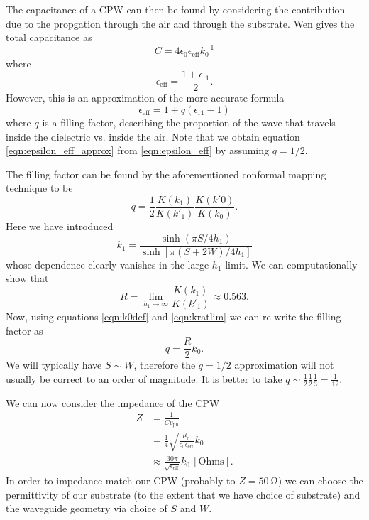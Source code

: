 \documentclass[a4paper]{article}
\begin{document}
The capacitance of a CPW can then be found by considering the contribution due
to the propgation through the air and through the substrate. Wen gives the
total capacitance as
\begin{equation}
  C = 4\epsilon_0\epsilon_\mathrm{eff} k_0^{-1}
\end{equation}
where
\begin{equation}
  \epsilon_\mathrm{eff} = \frac{1 + \epsilon_\mathrm{r1}}{2}.
  \label{eqn:epsilon_eff_approx}
\end{equation}
However, this is an approximation of the more accurate formula
\begin{equation}
  \epsilon_\mathrm{eff} = 1 + q(\epsilon_\mathrm{r1} - 1)
  \label{eqn:epsilon_eff}
\end{equation}
where $q$ is a filling factor, describing the proportion of the wave that
travels inside the dielectric vs. inside the air. Note that we obtain equation
\ref{eqn:epsilon_eff_approx} from \ref{eqn:epsilon_eff} by assuming $q = 1/2$.

The filling factor can be found by the aforementioned conformal mapping
technique to be
\begin{equation}
  q = \frac{1}{2}\frac{K(k_1)}{K(k'_1)}\frac{K(k'0)}{K(k_0)}.
  \label{eqn:fillfact}
\end{equation}
Here we have introduced
\begin{equation*}
  k_1 = \frac{\sinh (\pi S/ 4h_1)}{\sinh [\pi (S+2W)/4h_1]}
\end{equation*}
whose dependence clearly vanishes in the large $h_1$ limit. We can
computationally show that
\begin{equation}
  R = \lim_{h_1 \to \infty} \frac{K(k_1)}{K(k'_1)} \approx 0.563.
  \label{eqn:kratlim}
\end{equation}
Now, using equations \ref{eqn:k0def} and \ref{eqn:kratlim} we can re-write the
filling factor as
\begin{equation}
  q = \frac{R}{2}k_0.
\end{equation}
We will typically have $S\sim W$, therefore the $q=1/2$ approximation will  not
usually be correct to an order of magnitude. It is better to take $q\sim
\frac{1}{2} \frac{1}{2} \frac{1}{3} = \frac{1}{12}$.

We can now consider the impedance of the CPW
\begin{align}
  Z &= \frac{1}{C v_\mathrm{ph}} \\
    &= \frac{1}{4}\sqrt{\frac{\mu_0}{\epsilon_0 \epsilon_\mathrm{eff}}}k_0 \\
    &\approx \frac{30\pi}{\sqrt{\epsilon_\mathrm{eff}}}k_0 \, \mathrm{[Ohms]}.
\end{align}
In order to impedance match our CPW (probably to $Z=\SI{50}{\ohm}$) we can choose
the permittivity of our substrate (to the extent that we have choice of
substrate) and the waveguide geometry via choice of $S$ and $W$.
\end{document}
